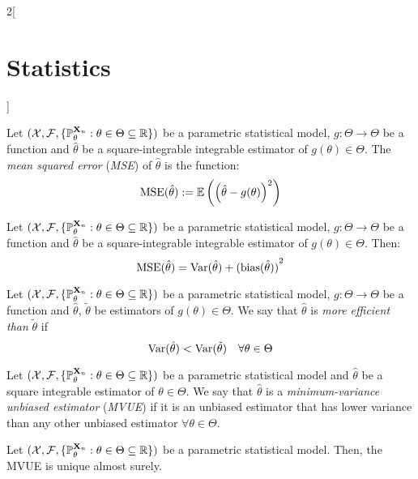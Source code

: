 \documentclass[../../../main_math.tex]{subfiles}
\begin{document}
\begin{multicols}{2}[\section{Statistics}]
\begin{definition}
    Let $(\mathcal{X},\mathcal{F},\{\mathbb{P}_{\theta}^{\boldsymbol{\mathrm{X}}_n}:{\theta}\in\Theta\subseteq \mathbb{R}\})$ be a parametric statistical model, $g:\Theta\rightarrow\Theta$ be a function and ${\hat\theta}$ be a square-integrable integrable estimator of $g({\theta})\in\Theta$. The \emph{mean squared error} (\emph{MSE}) of ${\hat\theta}$ is the function: $$\operatorname{MSE}({\hat\theta}):=\mathbb{E}\left({\left({\hat\theta}-g({\theta})\right)}^2\right)$$
  \end{definition}
  \begin{proposition}
    Let $(\mathcal{X},\mathcal{F},\{\mathbb{P}_{\theta}^{\boldsymbol{\mathrm{X}}_n}:{\theta}\in\Theta\subseteq \mathbb{R}\})$ be a parametric statistical model, $g:\Theta\rightarrow\Theta$ be a function and ${\hat\theta}$ be a square-integrable integrable estimator of $g({\theta})\in\Theta$. Then: $$\operatorname{MSE}({\hat\theta})=\mathrm{Var}({\hat\theta})+{(\operatorname{bias}({\hat\theta}))}^2$$
  \end{proposition}
  \begin{definition}
    Let $(\mathcal{X},\mathcal{F},\{\mathbb{P}_{\theta}^{\boldsymbol{\mathrm{X}}_n}:{\theta}\in\Theta\subseteq \mathbb{R}\})$ be a parametric statistical model, $g:\Theta\rightarrow\Theta$ be a function and ${\hat\theta}$, ${\tilde\theta}$ be estimators of $g({\theta})\in\Theta$. We say that ${\hat\theta}$ is \emph{more efficient than} ${\tilde\theta}$ if $$\mathrm{Var}{({\hat\theta})}<\mathrm{Var}{({\tilde\theta})}\quad\forall{\theta}\in\Theta$$
  \end{definition}
  \begin{definition}
    Let $(\mathcal{X},\mathcal{F},\{\mathbb{P}_{\theta}^{\boldsymbol{\mathrm{X}}_n}:{\theta}\in\Theta\subseteq \mathbb{R}\})$ be a parametric statistical model and ${\hat\theta}$ be a square integrable estimator of ${\theta}\in\Theta$. We say that ${\hat\theta}$ is a \emph{minimum-variance unbiased estimator} (\emph{MVUE}) if it is an unbiased estimator that has lower variance than any other unbiased estimator $\forall {\theta}\in\Theta$.
  \end{definition}
  \begin{proposition}
    Let $(\mathcal{X},\mathcal{F},\{\mathbb{P}_{\theta}^{\boldsymbol{\mathrm{X}}_n}:{\theta}\in\Theta\subseteq \mathbb{R}\})$ be a parametric statistical model. Then, the MVUE is unique almost surely.
  \end{proposition}

\end{multicols}
\end{document}

